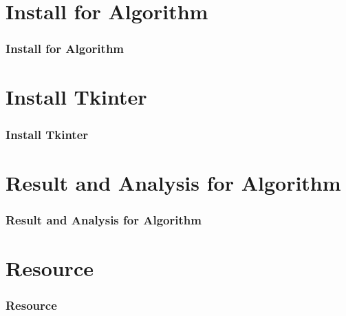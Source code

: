 \documentclass[10.5pt]{beamer}
\begin{document}
\section{Install for Algorithm}
\begin{frame}
	\frametitle{\fontsize{11.5pt}{12.5pt}\selectfont Install for Algorithm}
\end{frame}

\section{Install Tkinter}
\begin{frame}
	\frametitle{\fontsize{11.5pt}{12.5pt}\selectfont Install Tkinter}
\end{frame}

\section{Result and Analysis for Algorithm}
\begin{frame}
	\frametitle{\fontsize{11.5pt}{12.5pt}\selectfont  Result and Analysis for Algorithm}
\end{frame}

\section{Resource}
\begin{frame}
	\frametitle{\fontsize{11.5pt}{12.5pt}\selectfont Resource}
\end{frame}
\end{document}
